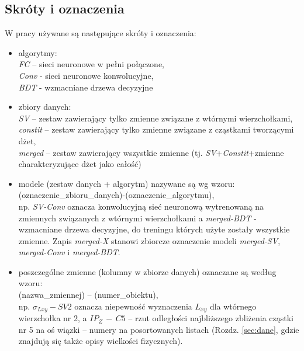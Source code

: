 \begin{appendices}
\section{Skróty i oznaczenia}
\label{sec:app:skroty}
W pracy używane są następujące skróty i oznaczenia: 
\begin{itemize}
	\item algorytmy: \\ \textit{FC} -- sieci neuronowe w pełni połączone,\\ \textit{Conv} - sieci neuronowe konwolucyjne,\\ \textit{BDT} - wzmacniane drzewa decyzyjne
	\item zbiory danych: \\ \textit{SV} -- zestaw zawierający tylko zmienne związane z wtórnymi wierzchołkami,\\ \textit{constit} -- zestaw zawierający tylko zmienne związane z cząstkami tworzącymi dżet,\\ \textit{merged} -- zestaw zawierający wszystkie zmienne (tj. \textit{SV}+\textit{Constit}+zmienne charakteryzujące dżet jako całość)
	\item modele (zestaw danych + algorytm) nazywane są wg wzoru: \\ (oznaczenie\_zbioru\_danych)-(oznaczenie\_algorytmu), \\np. \textit{SV-Conv} oznacza konwolucyjną sieć neuronową wytrenowaną na zmiennych związanych z wtórnymi wierzchołkami a \textit{merged-BDT} - wzmacniane drzewa decyzyjne, do treningu których użyte zostały wszystkie zmienne. Zapis \textit{merged-X} stanowi zbiorcze oznaczenie modeli \textit{merged-SV}, \textit{merged-Conv} i \textit{merged-BDT}.
	\item poszczególne zmienne (kolumny w zbiorze danych) oznaczane są według wzoru: \\ (nazwa\_zmiennej) -- (numer\_obiektu), \\np. $\sigma_{Lxy} - SV2$ oznacza niepewność wyznaczenia $L_{xy}$ dla wtórnego wierzchołka nr 2, a $IP_Z\,-\,C5$ -- rzut odległości najbliższego zbliżenia cząstki nr 5 na oś wiązki -- numery na posortowanych listach (Rozdz. \ref{sec:dane}, gdzie znajdują się także opisy wielkości fizycznych).
\end{itemize} 


\end{appendices}
